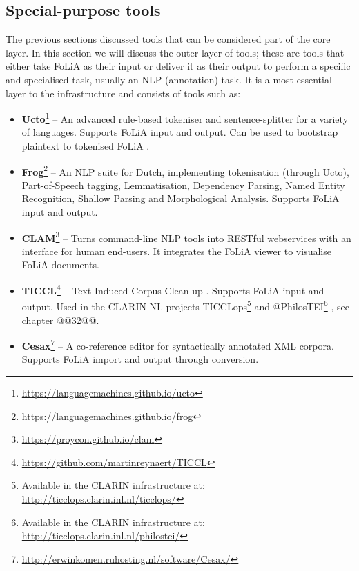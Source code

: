 \documentclass[a4paper,11pt]{article}
\begin{document}
\subsection{Special-purpose tools}

The previous sections discussed tools that can be considered part of the
core layer. In this section we will discuss the outer layer of tools; these are
tools that either take FoLiA as their input or deliver it as their output to
perform a specific and specialised task, usually an NLP (annotation) task.
It is a most essential layer to the infrastructure and consists of tools such as:

\begin{itemize}
\item \textbf{\textbf{Ucto}}\footnote{\url{https://languagemachines.github.io/ucto}} -- An advanced rule-based tokeniser and sentence-splitter for a variety of
    languages. Supports FoLiA
    input and output. Can be used to bootstrap plaintext to tokenised FoLiA \cite{UCTO}.
\item \textbf{\textbf{Frog}}\footnote{\url{https://languagemachines.github.io/frog}} -- An NLP suite for Dutch, implementing tokenisation (through
    Ucto), Part-of-Speech tagging, Lemmatisation, Dependency Parsing, Named
    Entity Recognition, Shallow Parsing and Morphological Analysis. Supports
    FoLiA input and output.
\item \textbf{\textbf{CLAM}}\footnote{\url{https://proycon.github.io/clam}} -- Turns command-line NLP tools into RESTful webservices with an
    interface for human end-users. It integrates the FoLiA viewer to visualise
    FoLiA documents. \cite{CLAM}
\item \textbf{\textbf{TICCL}}\footnote{\url{https://github.com/martinreynaert/TICCL}} -- Text-Induced Corpus Clean-up \cite{Reynaert2010}. Supports FoLiA
    input and output. Used in the CLARIN-NL projects TICCLops\footnote{Available in the CLARIN infrastructure at:
    \url{http://ticclops.clarin.inl.nl/ticclops/}} and @PhilosTEI\footnote{Available in the CLARIN infrastructure at:
\url{http://ticclops.clarin.inl.nl/philostei/}} \cite{Reynaert2014b}, see chapter @@32@@.
\item \textbf{\textbf{Cesax}}\footnote{\url{http://erwinkomen.ruhosting.nl/software/Cesax/}} -- A co-reference editor for syntactically annotated XML corpora.
    Supports FoLiA import and output through conversion.

\end{itemize}
\end{document}
